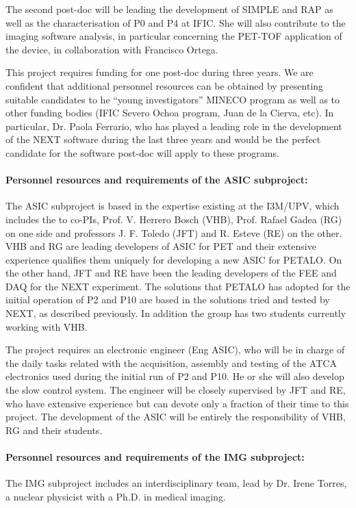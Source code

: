  The second post-doc will be leading the development of SIMPLE and RAP as well as the characterisation of P0 and P4 at IFIC. She will also contribute to the imaging software analysis, in particular concerning the PET-TOF application of the device, in collaboration with Francisco Ortega.
 
This project requires funding for one post-doc during three years. We are confident that additional personnel resources can be obtained by presenting suitable candidates to he ``young investigators'' MINECO program as well as to other funding bodies (IFIC Severo Ochoa program, Juan de la Cierva, etc). In particular,  
Dr. Paola Ferrario, who has played a leading role in the development of the NEXT software during the last three years and would be the perfect candidate for the software post-doc will apply to these programs. 
 
 \paragraph{Personnel resources and requirements of the ASIC subproject:} 

The ASIC subproject is based in the expertise existing  at the I3M/UPV, which includes the to co-PIs, Prof. V. Herrero Bosch (VHB), Prof. Rafael Gadea (RG) on one side and professors J. F. Toledo (JFT) and R. Esteve (RE) on the other. VHB and RG are leading developers of ASIC for PET and their extensive experience qualifies them uniquely for developing a new ASIC for PETALO. On the other hand, JFT and RE have been the leading developers of the FEE and DAQ for the NEXT experiment. The solutions that PETALO has adopted for the initial operation of P2 and P10 are based in the solutions tried and tested by NEXT, as described previously. 
In addition the group has two students currently working with VHB.

The project requires an electronic engineer (Eng ASIC), who will be in charge of the daily tasks related with the acquisition, assembly and testing of the ATCA electronics used during the initial run of P2 and P10.  He or she will also develop the slow control system. The engineer will be closely supervised by JFT and RE, who have extensive experience but can devote only a fraction of their time to this project. The development of the ASIC will be entirely the responsibility of VHB, RG and their students. 

 \paragraph{Personnel resources and requirements of the IMG subproject:}
 The IMG subproject includes an interdisciplinary team, lead by Dr. Irene Torres, a nuclear physicist with a Ph.D. in medical imaging. 
 
